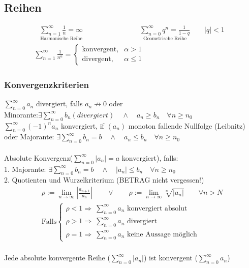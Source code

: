 \documentclass[6pt,a4paper]{scrartcl}
\newcommand{\abs}[1]{\ensuremath{\left\vert#1\right\vert}}
\newcommand{\Ra}[0]{\ensuremath{\Rightarrow}}
\begin{document}
\begin{multicols*}{4}
\subsection{Reihen}
\begin{eqnarray*}
	\underset{\text{Harmonische Reihe}}{\sum_{n=1}^\infty \frac{1}{n} = \infty} \qquad \qquad  \qquad \qquad \underset{\text{Geometrische Reihe}}{\sum_{n=0}^\infty q^n = \frac{1}{1-q}} \qquad |q|<1
\end{eqnarray*}
\begin{eqnarray*}
	\sum_{n=1}^\infty \frac{1}{n^\alpha} = \begin{cases} \text{konvergent}, & \alpha > 1 \\ \text{divergent}, & \alpha \le 1 \end{cases} \qquad \qquad \qquad \qquad \qquad \qquad
\end{eqnarray*}



\subsubsection{Konvergenzkriterien}
$\sum^{\infty}_{n = 0} a_n$ divergiert, falls $a_n \not \rightarrow 0$ oder\\
Minorante:$\exists \sum^{\infty}_{n = 0} b_n (divergiert) \quad \land \quad a_n \ge b_n \quad \forall n\ge n_0$\\[0.6em]
$\sum^{\infty}_{n = 0}(-1)^n a_n$ konvergiert, if $(a_n)$ monoton fallende Nullfolge (Leibnitz)\\
oder Majorante: $\exists \sum^{\infty}_{n = 0} b_n = b \quad \land \quad a_n \le b_n \quad \forall n\ge n_0$\\
\\
Absolute Konvergenz($\sum^\infty_{n=0} |a_n|=a$ konvergiert), falls:\\
1. Majorante: $\exists \sum^{\infty}_{n = 0} b_n = b \quad \land \quad |a_n| \le b_n \quad \forall n\ge n_0$\\
2. Quotienten und Wurzelkriterium (BETRAG nicht vergessen!)
\begin{eqnarray*}
	\rho := \lim_{n \rightarrow \infty} \abs{\frac{a_{n+1}}{a_n}} \qquad \lor \qquad \rho := \lim_{n \rightarrow \infty} \sqrt[n]{\abs{a_n}} \qquad \forall n > N\\
	\text{Falls}
	\begin{cases}
		\rho < 1 \Ra  ~\sum^\infty_{n=0} a_n \text{ konvergiert absolut} \\
		\rho > 1 \Ra  ~\sum^\infty_{n=0} a_n \text{ divergiert} \\
		\rho = 1 \Ra  ~\sum^\infty_{n=0} a_n \text{ keine Aussage möglich}
	\end{cases}
\end{eqnarray*}
\\
Jede absolute konvergente Reihe ($\sum^\infty_{n=0} |a_n|$) ist konvergent ($\sum^\infty_{n=0} a_n$)



\end{multicols*}
\end{document}
